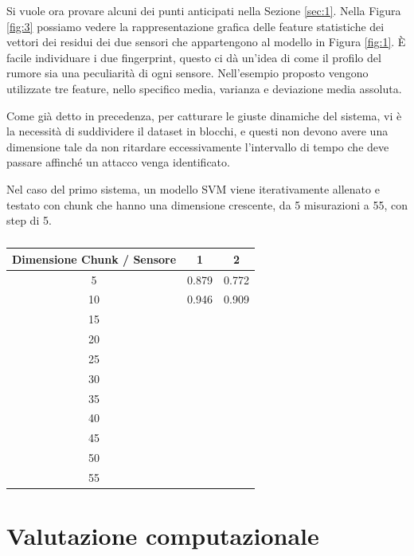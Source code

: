 \documentclass[Lau,binding=0.6cm]{sapthesis}
\begin{document}
Si vuole ora provare alcuni dei punti anticipati nella Sezione \ref{sec:1}.
Nella Figura \ref{fig:3} possiamo vedere la rappresentazione grafica delle feature statistiche dei vettori dei residui dei due sensori che appartengono al modello in Figura \ref{fig:1}.
\`E facile individuare i due fingerprint, questo ci d\`a un'idea di come il profilo del rumore sia una peculiarit\`a di ogni sensore. Nell'esempio proposto vengono utilizzate tre feature, nello specifico media, varianza e deviazione media assoluta.

Come gi\`a detto in precedenza, per catturare le giuste dinamiche del sistema, vi \`e la necessit\`a di suddividere il dataset in blocchi, e questi non devono avere una dimensione tale da non ritardare eccessivamente l'intervallo di tempo che deve passare affinch\'e un attacco venga identificato.

Nel caso del primo sistema, un modello SVM viene iterativamente allenato e testato con chunk che hanno una dimensione crescente, da 5 misurazioni a 55, con step di 5.

\begin{table}[tb]
    \begin{center}
    \begin{tabular}{|c|c|c|}
    \hline
    \textbf{Dimensione Chunk / Sensore} & \textbf{1} & \textbf{2} \\
    \hline
    5 & 0.879 & 0.772 \\
    \hline
    10 & 0.946 & 0.909 \\
    \hline
    15 & & \\
    \hline
    20 & & \\
    \hline
    25 & & \\
    \hline
    30 & & \\
    \hline
    35 & & \\
    \hline
    40 & & \\
    \hline
    45 & & \\
    \hline
    50 & & \\
    \hline
    55 & & \\
    \hline
    \end{tabular}
    \end{center}
    \caption{}
    \label{tab:2}
\end{table}

\section{Valutazione computazionale} %
\end{document}
